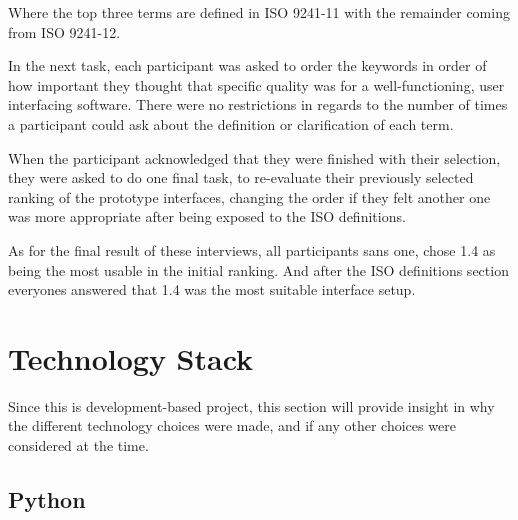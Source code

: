 {    Where the top three terms are defined in ISO 9241-11 with the remainder
    coming from ISO 9241-12.

    In the next task, each participant was asked to order the keywords
    in order of how important they thought that specific quality was for a
    well-functioning, user interfacing software. There were no restrictions
    in regards to the number of times a participant could ask about the
    definition or clarification of each term.

    When the participant acknowledged that they were finished with their
    selection, they were asked to do one final task, to re-evaluate their
    previously selected ranking of the prototype interfaces, changing the order
    if they felt another one was more appropriate after being exposed to the
    ISO definitions.

    As for the final result of these interviews, all participants sans one, chose 1.4 as being
    the most usable in the initial ranking. And after the ISO definitions
    section everyones answered that 1.4 was the most suitable interface setup.

%
%
%
%
\section{Technology Stack}

  Since this is development-based project, this section will provide insight in
  why the different technology choices were made, and if any other
  choices were considered at the time.

  \subsection{Python}

}
